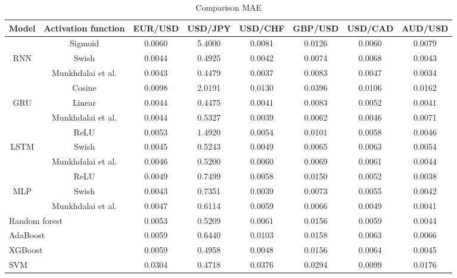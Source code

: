 \documentclass{ieeeaccess}
\begin{document}
\begin{table}[t]
  \caption{Comparison MAE}
  \small
  \centering
  \begin{tabular*}{0.9\textwidth}{c @{\extracolsep{\fill}} ccccccc}
    \hline
    \textbf{Model} & \textbf{Activation function} & \textbf{EUR/USD} & \textbf{USD/JPY} & \textbf{USD/CHF} & \textbf{GBP/USD} & \textbf{USD/CAD} & \textbf{AUD/USD} \\
    \hline

          & Sigmoid & 0.0060 & 5.4000 & 0.0081 & 0.0126 & 0.0060 & 0.0079 \\
    RNN   & Swish & 0.0044 & 0.4925 & 0.0042 & 0.0074 & 0.0068 & 0.0043 \\
          & Munkhdalai et al. & 0.0043 & 0.4479 & 0.0037 & 0.0083 & 0.0047 & 0.0034 \\
    \hline
          & Cosine & 0.0098 & 2.0191 & 0.0130 & 0.0396 & 0.0106 & 0.0162 \\
    GRU   & Linear & 0.0044 & 0.4475 & 0.0041 & 0.0083 & 0.0052 & 0.0041 \\
          & Munkhdalai et al. & 0.0044 & 0.5327 & 0.0039 & 0.0062 & 0.0046 & 0.0071 \\
    \hline
          & ReLU & 0.0053 & 1.4920 & 0.0054 & 0.0101 & 0.0058 & 0.0046 \\
    LSTM  & Swish & 0.0045 & 0.5243 & 0.0049 & 0.0065 & 0.0063 & 0.0054 \\
          & Munkhdalai et al. & 0.0046 & 0.5200 & 0.0060 & 0.0069 & 0.0061 & 0.0044 \\
    \hline

          & ReLU & 0.0049 & 0.7499 & 0.0058 & 0.0150 & 0.0052 & 0.0038 \\
    MLP   & Swish & 0.0043 & 0.7351 & 0.0039 & 0.0073 & 0.0055 & 0.0042 \\
          & Munkhdalai et al. & 0.0047 & 0.6114 & 0.0059 & 0.0066 & 0.0049 & 0.0041 \\
          

    \hline

    \multicolumn{2}{l}{Random forest} & 0.0053 & 0.5209 & 0.0061 & 0.0156 & 0.0059 & 0.0044 \\
    \multicolumn{2}{l}{AdaBoost} & 0.0059 & 0.6440 & 0.0103 & 0.0158 & 0.0063 & 0.0066 \\
    \multicolumn{2}{l}{XGBoost} & 0.0059 & 0.4958 & 0.0048 & 0.0156 & 0.0064 & 0.0045 \\
    \multicolumn{2}{l}{SVM} & 0.0304 & 0.4718 & 0.0376 & 0.0294 & 0.0099 & 0.0176 \\


\end{tabular*}
\end{table}
\end{document}
